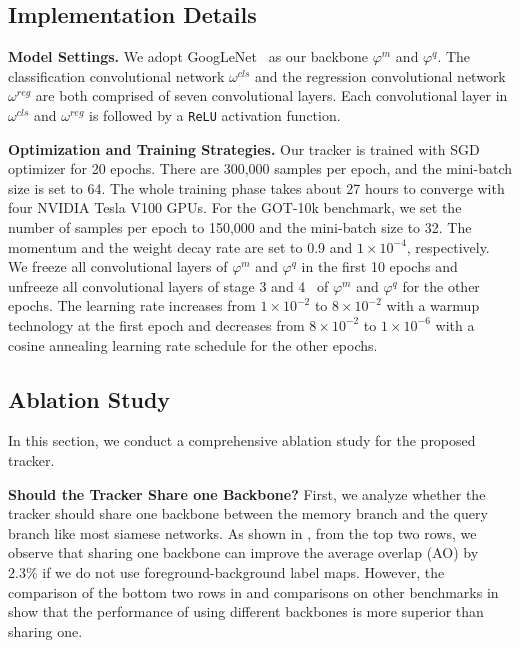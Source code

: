 \documentclass[final]{cvpr}
\begin{document}
\subsection{Implementation Details}
\textbf{Model Settings.}
We adopt GoogLeNet~\cite{szegedy2015going} as our backbone $\varphi^{m}$ and $\varphi^{q}$.
The classification convolutional network $\omega^{cls}$ and the regression convolutional network $\omega^{reg}$ are both comprised of seven convolutional layers.
Each convolutional layer in $\omega^{cls}$ and $\omega^{reg}$ is followed by a \verb!ReLU! activation function.
\par
\textbf{Optimization and Training Strategies.}
Our tracker is trained with SGD optimizer for 20 epochs.
There are 300,000 samples per epoch, and the mini-batch size is set to 64.
The whole training phase takes about 27 hours to converge with four NVIDIA Tesla V100 GPUs.
For the GOT-10k benchmark, we set the number of samples per epoch to 150,000 and the mini-batch size to 32.
The momentum and the weight decay rate are set to 0.9 and $1 \times 10^{-4}$, respectively.
We freeze all convolutional layers of $\varphi^{m}$ and $\varphi^{q}$ in the first 10 epochs and unfreeze all convolutional layers of stage 3 and 4~\cite{szegedy2015going} of $\varphi^{m}$ and $\varphi^{q}$ for the other epochs.
The learning rate increases from $1 \times 10^{-2}$ to $8 \times 10^{-2}$ with a warmup technology at the first epoch and decreases from $8 \times 10^{-2}$ to $1 \times 10^{-6}$ with a cosine annealing learning rate schedule for the other epochs.

\subsection{Ablation Study}\label{subsec:ablation-study}
In this section, we conduct a comprehensive ablation study for the proposed tracker.
\par
\textbf{Should the Tracker Share one Backbone?}
First, we analyze whether the tracker should share one backbone between the memory branch and the query branch like most siamese networks. As shown in , from the top two rows, we observe that sharing one backbone can improve the average overlap (AO) by $2.3\%$ if we do not use foreground-background label maps.
However, the comparison of the bottom two rows in  and comparisons on other benchmarks in  show that the performance of using different backbones is more superior than sharing one.
\end{document}
